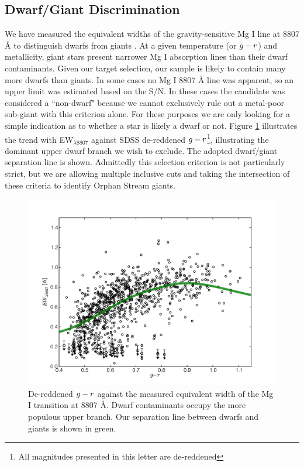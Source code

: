 \documentclass{emulateapj}
\begin{document}
\subsection{Dwarf/Giant Discrimination}
\label{sec:dwarf-giant}

We have measured the equivalent widths of the gravity-sensitive Mg I line at 8807 \AA{} to distinguish dwarfs from giants \citep{Battaglia;Starkenburg_2012}. At a given temperature (or $g \-- r$) and metallicity, giant stars present narrower Mg I absorption lines than their dwarf contaminants. Given our target selection, our sample is likely to contain many more dwarfs than giants. In some cases no Mg I 8807 \AA{} line was apparent, so an upper limit was estimated based on the S/N. In these cases the candidate was considered a ``non-dwarf" because we cannot exclusively rule out a metal-poor sub-giant with this criterion alone. For these purposes we are only looking for a simple indication as to whether a star is likely a dwarf or not. Figure \ref{fig:ew-mg} illustrates the trend with EW$_{\lambda8807}$ against SDSS de-reddened $g \-- r$\footnote{All magnitudes presented in this letter are de-reddened}, illustrating the dominant upper dwarf branch we wish to exclude. The adopted dwarf/giant separation line is shown. Admittedly this selection criterion is not particularly strict, but we are allowing multiple inclusive cuts and taking the intersection of these criteria to identify Orphan Stream giants.

\begin{figure}[h]
	\includegraphics[width=\columnwidth]{./figures/ew-mg.pdf}
	\caption{De-reddened $g \-- r$ against the measured equivalent width of the Mg I transition at 8807 \AA{}. Dwarf contaminants occupy the more populous upper branch. Our separation line between dwarfs and giants is shown in green.}
	\label{fig:ew-mg}
\end{figure}
\end{document}
